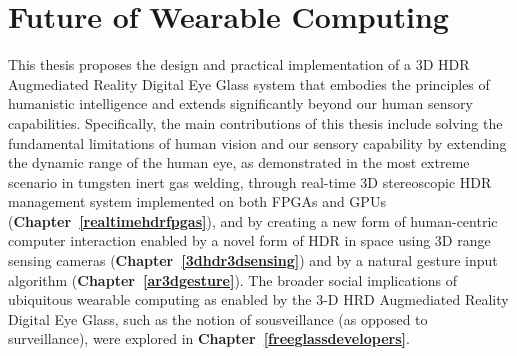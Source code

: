 \chapter{Future of Wearable Computing}




This thesis proposes the design and practical implementation of a 3D HDR Augmediated Reality Digital Eye Glass system that embodies the principles of humanistic intelligence and extends significantly beyond our human sensory capabilities.  Specifically, the main contributions of this thesis include solving the fundamental limitations of human vision and our sensory capability by extending the dynamic range of the human eye, as demonstrated in the most extreme scenario in tungsten inert gas welding, through real-time 3D stereoscopic HDR management system implemented on both FPGAs and GPUs (\textbf{Chapter~\ref{realtimehdrfpgas}}), and by creating a new form of human-centric computer interaction enabled by a novel form of HDR in space using 3D range sensing cameras (\textbf{Chapter~\ref{3dhdr3dsensing}}) and by a natural gesture input algorithm (\textbf{Chapter~\ref{ar3dgesture}}).  The broader social implications of ubiquitous wearable computing as enabled by the 3-D HRD Augmediated Reality Digital Eye Glass, such as the notion of sousveillance (as opposed to surveillance), were explored in \textbf{Chapter~\ref{freeglassdevelopers}}. 

